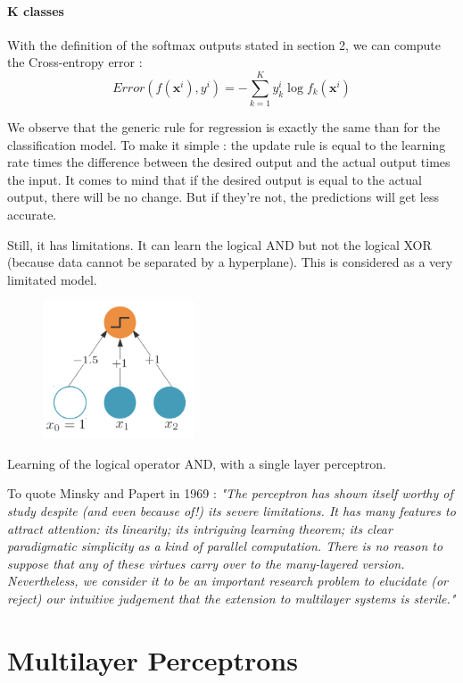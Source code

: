 \documentclass[a4paper,12pt]{article}
\newcommand{\xx}{{\bm x}}
\begin{document}
\paragraph*{K classes} 
With the definition of the softmax outputs stated in section 2, we can compute the Cross-entropy error :
\[ Error(f(\xx^i), y^i) = - \sum_{k=1}^K y_k^i \log f_k(\xx^i) \]


\indent
We observe that the generic rule for regression is exactly the same than for the classification model. To make it simple : the update rule is equal to the learning rate times the difference between the desired output and the actual output times the input. It comes to mind that if the desired output is equal to the actual output, there will be no change. But if they're not, the predictions will get less accurate.

\indent
Still, it has limitations. It can learn the logical AND but not the logical XOR (because data cannot be separated by a hyperplane). This is considered as a very limitated model.


\begin{figure}[!ht]
\centerline{\includegraphics[width=0.4\textwidth]{./figures/perceptron_AND.png}}
\end{figure}
\centerline{\footnotesize{Learning of the logical operator AND, with a single layer perceptron.}}
\vspace{0.1in}

\indent
To quote Minsky and Papert in 1969 : {\itshape"The perceptron has shown itself worthy of study despite (and even because of!) its severe limitations. It has many features to attract attention: its linearity; its intriguing learning theorem; its clear paradigmatic simplicity as a kind of parallel computation. There is no reason to suppose that any of these virtues carry over to the many-layered version. Nevertheless, we consider it to be an important research problem to elucidate (or reject) our intuitive judgement that the extension to multilayer systems is sterile."}

\section{Multilayer Perceptrons}
\end{document}
